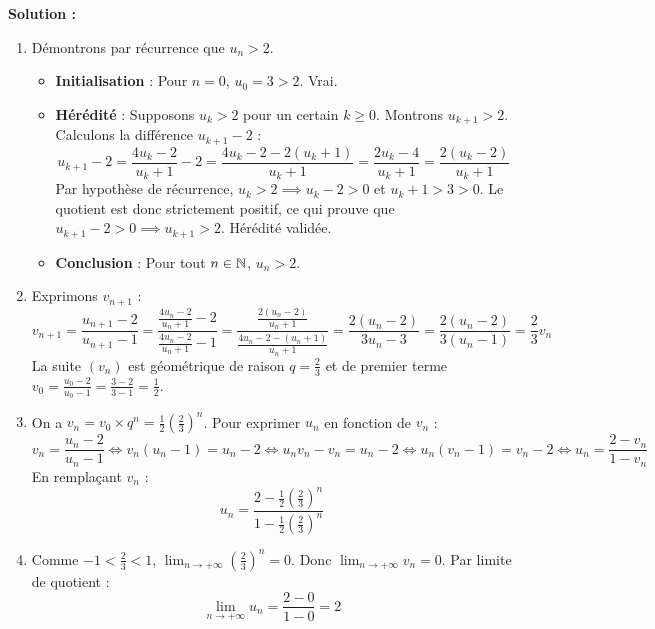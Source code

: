 \textbf{Solution :}
\begin{enumerate}
    \item Démontrons par récurrence que $u_n > 2$.
    \begin{itemize}
        \item \textbf{Initialisation} : Pour $n = 0$, $u_0 = 3 > 2$. Vrai.
        \item \textbf{Hérédité} : Supposons $u_k > 2$ pour un certain $k \ge 0$. Montrons $u_{k+1} > 2$.
        Calculons la différence $u_{k+1} - 2$ :
        \[
        u_{k+1} - 2 = \frac{4u_k - 2}{u_k + 1} - 2 = \frac{4u_k - 2 - 2(u_k + 1)}{u_k + 1} = \frac{2u_k - 4}{u_k + 1} = \frac{2(u_k - 2)}{u_k + 1}
        \]
        Par hypothèse de récurrence, $u_k > 2 \implies u_k - 2 > 0$ et $u_k + 1 > 3 > 0$.
        Le quotient est donc strictement positif, ce qui prouve que $u_{k+1} - 2 > 0 \implies u_{k+1} > 2$. Hérédité validée.
        \item \textbf{Conclusion} : Pour tout $n \in \mathbb{N}$, $u_n > 2$.
    \end{itemize}
    
    \item Exprimons $v_{n+1}$ :
    \[
    v_{n+1} = \frac{u_{n+1} - 2}{u_{n+1} - 1} = \frac{\frac{4u_n - 2}{u_n + 1} - 2}{\frac{4u_n - 2}{u_n + 1} - 1} = \frac{\frac{2(u_n - 2)}{u_n + 1}}{\frac{4u_n - 2 - (u_n + 1)}{u_n + 1}} = \frac{2(u_n - 2)}{3u_n - 3} = \frac{2(u_n - 2)}{3(u_n - 1)} = \frac{2}{3} v_n
    \]
    La suite $(v_n)$ est géométrique de raison $q = \frac{2}{3}$ et de premier terme $v_0 = \frac{u_0 - 2}{u_0 - 1} = \frac{3-2}{3-1} = \frac{1}{2}$.
    
    \item On a $v_n = v_0 \times q^n = \frac{1}{2} \left(\frac{2}{3}\right)^n$.
    Pour exprimer $u_n$ en fonction de $v_n$ :
    \[
    v_n = \frac{u_n - 2}{u_n - 1} \iff v_n(u_n - 1) = u_n - 2 \iff u_n v_n - v_n = u_n - 2 \iff u_n(v_n - 1) = v_n - 2 \iff u_n = \frac{2 - v_n}{1 - v_n}
    \]
    En remplaçant $v_n$ :
    \[
    u_n = \frac{2 - \frac{1}{2} \left(\frac{2}{3}\right)^n}{1 - \frac{1}{2} \left(\frac{2}{3}\right)^n}
    \]
    
    \item Comme $-1 < \frac{2}{3} < 1$, $\lim_{n \to +\infty} \left(\frac{2}{3}\right)^n = 0$.
    Donc $\lim_{n \to +\infty} v_n = 0$. Par limite de quotient :
    \[
    \lim_{n \to +\infty} u_n = \frac{2 - 0}{1 - 0} = 2
    \]
\end{enumerate}

